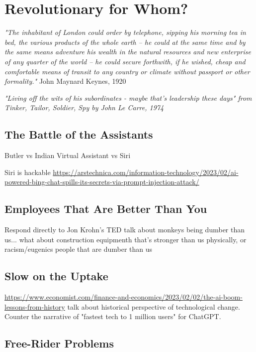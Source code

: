 \setchapterpreamble[u]{\margintoc}
\chapter{Revolutionary for Whom?}

\textit{"The inhabitant of London could order by telephone, sipping his morning tea in bed, the various products of the whole earth -- he could at the same time and by the same means adventure his wealth in the natural resources and new enterprise of any quarter of the world -- he could secure forthwith, if he wished, cheap and comfortable means of transit to any country or climate without passport or other formality."} John Maynard Keynes, 1920 \cite{Keynes2012}

\textit{"Living off the wits of his subordinates - maybe that's leadership these days" from Tinker, Tailor, Soldier, Spy by John Le Carre, 1974}\cite{Lecarre}

\section{The Battle of the Assistants}

Butler vs Indian Virtual Assistant vs Siri

Siri is hackable \url{https://arstechnica.com/information-technology/2023/02/ai-powered-bing-chat-spills-its-secrets-via-prompt-injection-attack/}

\section{Employees That Are Better Than You}

Respond directly to Jon Krohn's TED talk about monkeys being dumber than us... what about construction equipmenth that's stronger than us physically, or racism/eugenics people that are dumber than us 

\section{Slow on the Uptake}

\url{https://www.economist.com/finance-and-economics/2023/02/02/the-ai-boom-lessons-from-history} talk about historical perspective of technological change. Counter the narrative of "fastest tech to 1 million users" for ChatGPT.

\section{Free-Rider Problems}

